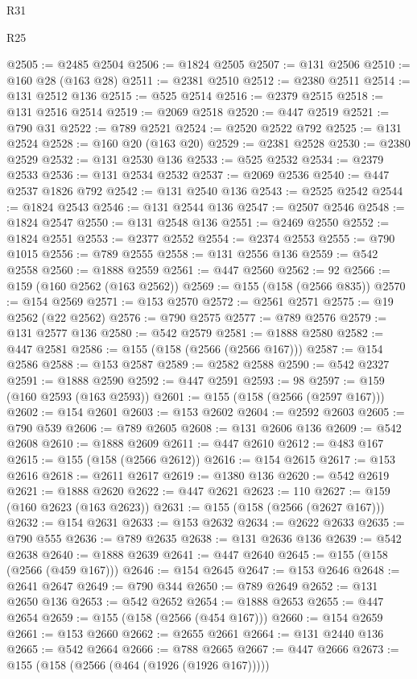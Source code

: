 \begin{lexlean}{R31}
\begin{lexlean}{R25}
\begin{coremodule}
{{{{{{{{{{{{{{{{{{{{{{{{{{{{{{{{{{{{{{{{{{{{{{{{{{{{{{{{{{{{{{{{{{{{{{{{{{{{{{{{{{{{{{{{{{{{{{{{{{{{{{{{{{{{{{{{{{{{{{{{{{{{{{{{{{{{{{{{{{{{{{{{{{{{{{{{{{{{{{{{{{{{{{{{{{{{{{{{{{{{{{{{{{{{{{{{{{{{{{{@2505 := @2485 @2504
@2506 := @1824 @2505
@2507 := @131 @2506
@2510 := @160 @28 (@163 @28)
@2511 := @2381 @2510
@2512 := @2380 @2511
@2514 := @131 @2512 @136
@2515 := @525 @2514
@2516 := @2379 @2515
@2518 := @131 @2516 @2514
@2519 := @2069 @2518
@2520 := @447 @2519
@2521 := @790 @31
@2522 := @789 @2521
@2524 := @2520 @2522 @792
@2525 := @131 @2524
@2528 := @160 @20 (@163 @20)
@2529 := @2381 @2528
@2530 := @2380 @2529
@2532 := @131 @2530 @136
@2533 := @525 @2532
@2534 := @2379 @2533
@2536 := @131 @2534 @2532
@2537 := @2069 @2536
@2540 := @447 @2537 @1826 @792
@2542 := @131 @2540 @136
@2543 := @2525 @2542
@2544 := @1824 @2543
@2546 := @131 @2544 @136
@2547 := @2507 @2546
@2548 := @1824 @2547
@2550 := @131 @2548 @136
@2551 := @2469 @2550
@2552 := @1824 @2551
@2553 := @2377 @2552
@2554 := @2374 @2553
@2555 := @790 @1015
@2556 := @789 @2555
@2558 := @131 @2556 @136
@2559 := @542 @2558
@2560 := @1888 @2559
@2561 := @447 @2560
@2562 := 92
@2566 := @159 (@160 @2562 (@163 @2562))
@2569 := @155 (@158 (@2566 @835))
@2570 := @154 @2569
@2571 := @153 @2570
@2572 := @2561 @2571
@2575 := @19 @2562 (@22 @2562)
@2576 := @790 @2575
@2577 := @789 @2576
@2579 := @131 @2577 @136
@2580 := @542 @2579
@2581 := @1888 @2580
@2582 := @447 @2581
@2586 := @155 (@158 (@2566 (@2566 @167)))
@2587 := @154 @2586
@2588 := @153 @2587
@2589 := @2582 @2588
@2590 := @542 @2327
@2591 := @1888 @2590
@2592 := @447 @2591
@2593 := 98
@2597 := @159 (@160 @2593 (@163 @2593))
@2601 := @155 (@158 (@2566 (@2597 @167)))
@2602 := @154 @2601
@2603 := @153 @2602
@2604 := @2592 @2603
@2605 := @790 @539
@2606 := @789 @2605
@2608 := @131 @2606 @136
@2609 := @542 @2608
@2610 := @1888 @2609
@2611 := @447 @2610
@2612 := @483 @167
@2615 := @155 (@158 (@2566 @2612))
@2616 := @154 @2615
@2617 := @153 @2616
@2618 := @2611 @2617
@2619 := @1380 @136
@2620 := @542 @2619
@2621 := @1888 @2620
@2622 := @447 @2621
@2623 := 110
@2627 := @159 (@160 @2623 (@163 @2623))
@2631 := @155 (@158 (@2566 (@2627 @167)))
@2632 := @154 @2631
@2633 := @153 @2632
@2634 := @2622 @2633
@2635 := @790 @555
@2636 := @789 @2635
@2638 := @131 @2636 @136
@2639 := @542 @2638
@2640 := @1888 @2639
@2641 := @447 @2640
@2645 := @155 (@158 (@2566 (@459 @167)))
@2646 := @154 @2645
@2647 := @153 @2646
@2648 := @2641 @2647
@2649 := @790 @344
@2650 := @789 @2649
@2652 := @131 @2650 @136
@2653 := @542 @2652
@2654 := @1888 @2653
@2655 := @447 @2654
@2659 := @155 (@158 (@2566 (@454 @167)))
@2660 := @154 @2659
@2661 := @153 @2660
@2662 := @2655 @2661
@2664 := @131 @2440 @136
@2665 := @542 @2664
@2666 := @788 @2665
@2667 := @447 @2666
@2673 := @155 (@158 (@2566 (@464 (@1926 (@1926 @167)))))
}}}}}}}}}}}}}}}}}}}}}}}}}}}}}}}}}}}}}}}}}}}}}}}}}}}}}}}}}}}}}}}}}}}}}}}}}}}}}}}}}}}}}}}}}}}}}}}}}}}}}}}}}}}}}}}}}}}}}}}}}}}}}}}}}}}}}}}}}}}}}}}}}}}}}}}}}}}}}}}}}}}}}}}}}}}}}}}}}}}}}}}}}}}}}}}}}}}}}}}
\end{coremodule}
\end{lexlean}
\end{lexlean}
